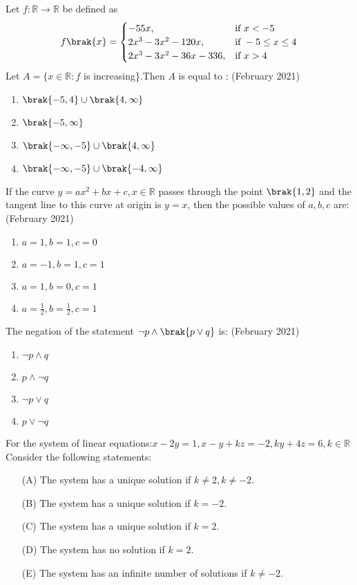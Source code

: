     \item Let $f:\mathbb{R}\rightarrow\mathbb{R}$ be defined as 
    \[
    f\brak{x}=
    \begin{cases}
        -55x,&\text{if } x<-5\\
        2x^3-3x^2-120x,&\text{if } -5\leq x\leq4\\
        2x^3-3x^2-36x-336,&\text{if } x>4
    \end{cases}
    \]
    Let $A=\{x \in \mathbb{R}:f$ is increasing\}.Then $A$ is equal to :
    \hfill{(February 2021)} 
    \begin{enumerate}
        \item $\brak{-5,4} \cup \brak{4,\infty}$
        \item $\brak{-5,\infty}$
        \item $\brak{-\infty,-5} \cup \brak{4,\infty}$
        \item $\brak{-\infty,-5} \cup \brak{-4,\infty}$
    \end{enumerate}
    \item If the curve $y = ax^2 + bx + c,x \in \mathbb{R}$ passes through the point $\brak{1, 2}$ and the tangent line to this curve at origin is $y = x$, then the possible values of $a, b, c$ are:
    \hfill{(February 2021)} 
    \begin{enumerate}
        \item $a = 1, b = 1, c = 0$
        \item $a = -1, b = 1, c = 1$
        \item $a = 1, b = 0, c = 1$
        \item $a = \frac{1}{2}, b = \frac{1}{2}, c = 1$
    \end{enumerate}
    \item  The negation of the statement $\neg p\land \brak{p\lor q}$ is:
    \hfill{(February 2021)} 
    \begin{enumerate}
        \item $\neg p\land q$
        \item $p \land \neg q$
        \item $\neg p \lor q$
        \item $p \lor \neg q$
    \end{enumerate}
    \item For the system of linear equations:$x-2y = 1, x-y + kz = -2, ky + 4z = 6,k \in \mathbb{R}$\\
    Consider the following statements:
    \begin{enumerate}
    \item[(A)] The system has a unique solution if $k \neq 2, k \neq -2 $.
    \item[(B)] The system has a unique solution if $ k = -2 $.
    \item[(C)] The system has a unique solution if $k = 2 $.
    \item[(D)] The system has no solution if $ k = 2$.
    \item[(E)] The system has an infinite number of solutions if $ k \neq -2$.
    \end{enumerate}
